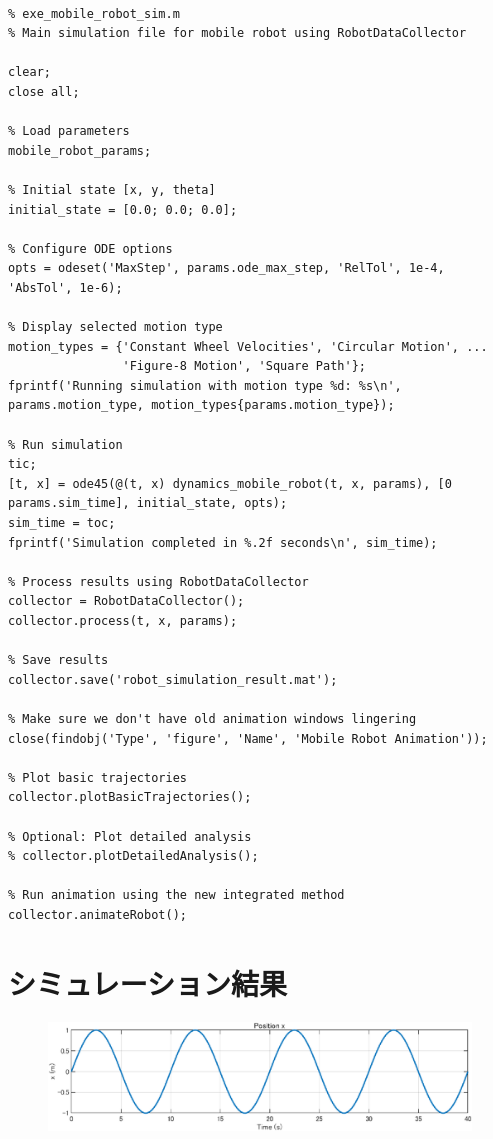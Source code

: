 \documentclass[10pt,a4paper,titlepage]{jreport} %
\begin{document}
\begin{lstlisting}[caption=exe＿mobile＿robot＿sim.m]

% exe_mobile_robot_sim.m
% Main simulation file for mobile robot using RobotDataCollector

clear;
close all;

% Load parameters
mobile_robot_params;

% Initial state [x, y, theta]
initial_state = [0.0; 0.0; 0.0];

% Configure ODE options
opts = odeset('MaxStep', params.ode_max_step, 'RelTol', 1e-4, 'AbsTol', 1e-6);

% Display selected motion type
motion_types = {'Constant Wheel Velocities', 'Circular Motion', ...
                'Figure-8 Motion', 'Square Path'};
fprintf('Running simulation with motion type %d: %s\n', params.motion_type, motion_types{params.motion_type});

% Run simulation
tic;
[t, x] = ode45(@(t, x) dynamics_mobile_robot(t, x, params), [0 params.sim_time], initial_state, opts);
sim_time = toc;
fprintf('Simulation completed in %.2f seconds\n', sim_time);

% Process results using RobotDataCollector
collector = RobotDataCollector();
collector.process(t, x, params);

% Save results
collector.save('robot_simulation_result.mat');

% Make sure we don't have old animation windows lingering
close(findobj('Type', 'figure', 'Name', 'Mobile Robot Animation'));

% Plot basic trajectories
collector.plotBasicTrajectories();

% Optional: Plot detailed analysis
% collector.plotDetailedAnalysis();

% Run animation using the new integrated method
collector.animateRobot();

\end{lstlisting}

\chapter{シミュレーション結果}

\begin{figure}[H] %
  \centering
  \includegraphics[width=0.6\linewidth]{R101_102_4_picture1.eps} %
\end{figure}
\end{document}
